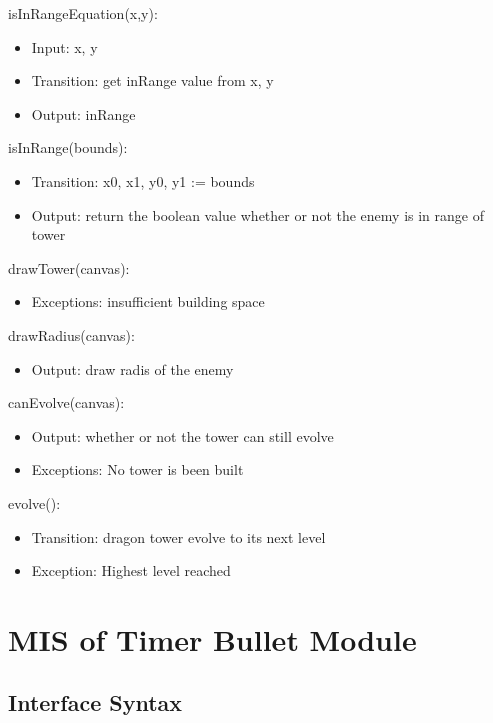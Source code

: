 \documentclass[12,english]{article}
\begin{document}
\noindent isInRangeEquation(x,y):
\begin{itemize}
    \item Input: x, y
    \item Transition: get inRange value from x, y
    \item Output: inRange
\end{itemize}

\noindent isInRange(bounds):
\begin{itemize}
    \item Transition: x0, x1, y0, y1 := bounds
    \item Output: return the boolean value whether or not the enemy is in range of tower
\end{itemize}

\noindent drawTower(canvas):
\begin{itemize}
    \item Exceptions: insufficient building space
\end{itemize}

\noindent drawRadius(canvas):
\begin{itemize}
    \item Output: draw radis of the enemy
\end{itemize}

\noindent canEvolve(canvas):
\begin{itemize}
    \item Output:  whether or not the tower can still evolve
    \item Exceptions: No tower is been built
\end{itemize}

\noindent evolve():
\begin{itemize}
    \item Transition: dragon tower evolve to its next level
    \item Exception:  Highest level reached
\end{itemize}

\section{MIS of Timer Bullet Module}
\subsection{Interface Syntax}
\end{document}
